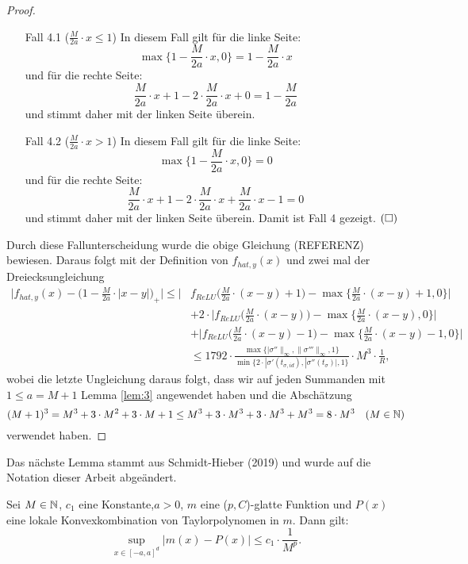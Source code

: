 \begin{proof}
\begin{itemize}
  \item[Fall 4.1] ($\frac{M}{2a} \cdot x \leq 1$) In diesem Fall gilt für die linke Seite$\colon$ 
  $$\max\{1 - \frac{M}{2a} \cdot x, 0\} = 1 - \frac{M}{2a} \cdot x$$ und für die rechte Seite$\colon$ 
  $$\frac{M}{2a} \cdot x + 1 - 2 \cdot \frac{M}{2a} \cdot x + 0 = 1 - \frac{M}{2a}$$ und stimmt daher mit der linken Seite überein.
  \item[Fall 4.2] ($\frac{M}{2a} \cdot x > 1$) In diesem Fall gilt für die linke Seite$\colon$ 
  $$\max\{1 - \frac{M}{2a} \cdot x, 0\} = 0$$ und für die rechte Seite$\colon$ 
  $$\frac{M}{2a} \cdot x + 1 - 2 \cdot \frac{M}{2a} \cdot x + \frac{M}{2a} \cdot x - 1 = 0$$ und stimmt daher mit der linken Seite überein. Damit ist Fall 4 gezeigt. $\hfill(\square)$
\end{itemize} 
Durch diese Fallunterscheidung wurde die obige Gleichung (REFERENZ) bewiesen. Daraus folgt mit der Definition von $f_{hat,y}(x)$ und zwei mal der Dreiecksungleichung
\begin{equation*}
\begin{split}
\bigg|f_{hat,y}(x) - \bigg(1 - \frac{M}{2a} \cdot |x - y|\bigg)_+\bigg| \leq \bigg|&f_{ReLU} \bigg(\frac{M}{2a} \cdot (x - y) + 1\bigg) - \max\{\frac{M}{2a} \cdot (x - y) + 1, 0\}\bigg| \\ 
& + 2 \cdot \bigg|f_{ReLU}\bigg(\frac{M}{2a} \cdot (x - y)\bigg) - \max\{\frac{M}{2a} \cdot (x - y), 0\}\bigg| \\
& + \bigg|f_{ReLU}\bigg(\frac{M}{2a} \cdot (x - y) - 1\bigg) - \max\{\frac{M}{2a} \cdot (x - y) - 1, 0\}\bigg|\\ 
& \leq 1792 \cdot \frac{\max\{|\sigma''\|_{\infty}, \|\sigma'''\|_{\infty}, 1\}}{\min\{2 \cdot |\sigma'(t_{\sigma, id}), |\sigma''(t_{\sigma})|, 1\}} \cdot M^3 \cdot \frac{1}{R},
\end{split}
\end{equation*} 
wobei die letzte Ungleichung daraus folgt, dass wir auf jeden Summanden mit $1 \leq a = M + 1$ Lemma \ref{lem:3} angewendet haben und die Abschätzung 
$$ (M + 1)^3 = M^3 + 3 \cdot M^2 + 3 \cdot M + 1 \leq M^3 + 3 \cdot M^3 + 3 \cdot M ^3 + M^3 = 8 \cdot M^3 \quad (M \in \mathbb{N})$$ verwendet haben.
  \end{proof}
  Das nächste Lemma stammt aus Schmidt-Hieber (2019) und wurde auf die Notation dieser Arbeit abgeändert.
  \begin{lem}
  \label{lem:5}
  Sei $M \in \mathbb{N}$, $c_1$ eine Konstante,$a > 0$, $m$ eine ($p, C$)-glatte Funktion und $P(x)$ eine lokale Konvexkombination von Taylorpolynomen in $m$. Dann gilt$\colon$
  $$\sup_{x \in [-a, a]^d} |m(x) - P(x)| \leq c_1 \cdot \frac{1}{M^p}.$$
  \end{lem}